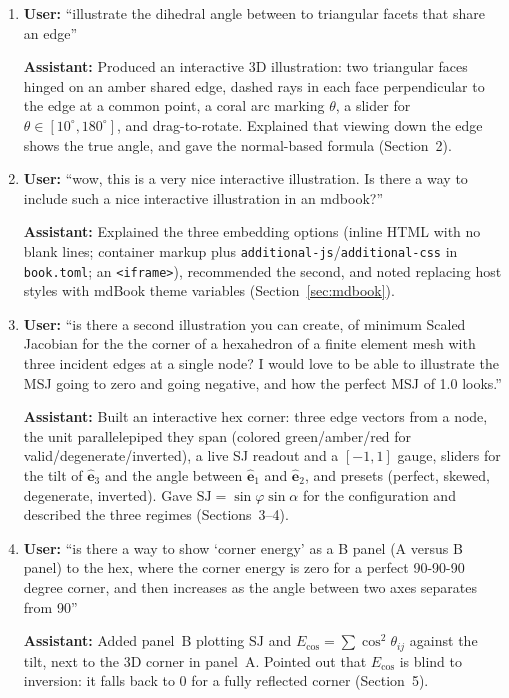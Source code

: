 \documentclass[11pt]{article}
\theoremstyle{definition}
\theoremstyle{remark}
\newcommand{\uv}[1]{\hat{\bm{#1}}}
\newcommand{\Eu}{E_{\cos}}
\newcommand{\SJ}{\mathrm{SJ}}
\begin{document}
\begin{enumerate}[label=\textbf{\arabic*.},leftmargin=*,itemsep=0.8em]
\item \textbf{User:} ``illustrate the dihedral angle between to triangular facets that share an edge''

\textbf{Assistant:} Produced an interactive 3D illustration: two triangular faces hinged on an
amber shared edge, dashed rays in each face perpendicular to the edge at a common point, a
coral arc marking $\theta$, a slider for $\theta\in[10^\circ,180^\circ]$, and drag-to-rotate. Explained
that viewing down the edge shows the true angle, and gave the normal-based formula
(Section~2).

\item \textbf{User:} ``wow, this is a very nice interactive illustration. Is there a way to include
such a nice interactive illustration in an mdbook?''

\textbf{Assistant:} Explained the three embedding options (inline HTML with no blank lines;
container markup plus \verb|additional-js|/\verb|additional-css| in \verb|book.toml|; an
\texttt{<iframe>}), recommended the second, and noted replacing host styles with mdBook theme
variables (Section~\ref{sec:mdbook}).

\item \textbf{User:} ``is there a second illustration you can create, of minimum Scaled Jacobian
for the the corner of a hexahedron of a finite element mesh with three incident edges at a single
node? I would love to be able to illustrate the MSJ going to zero and going negative, and how the
perfect MSJ of 1.0 looks.''

\textbf{Assistant:} Built an interactive hex corner: three edge vectors from a node, the unit
parallelepiped they span (colored green/amber/red for valid/degenerate/inverted), a live SJ
readout and a $[-1,1]$ gauge, sliders for the tilt of $\uv{e}_3$ and the angle between $\uv{e}_1$ and
$\uv{e}_2$, and presets (perfect, skewed, degenerate, inverted). Gave $\SJ=\sin\varphi\sin\alpha$ for
the configuration and described the three regimes (Sections~3--4).

\item \textbf{User:} ``is there a way to show `corner energy' as a B panel (A versus B panel) to the
hex, where the corner energy is zero for a perfect 90-90-90 degree corner, and then increases as
the angle between two axes separates from 90''

\textbf{Assistant:} Added panel~B plotting $\SJ$ and $\Eu=\sum\cos^2\theta_{ij}$ against the tilt,
next to the 3D corner in panel~A. Pointed out that $\Eu$ is blind to inversion: it falls back to $0$
for a fully reflected corner (Section~5).


\end{enumerate}
\end{document}
